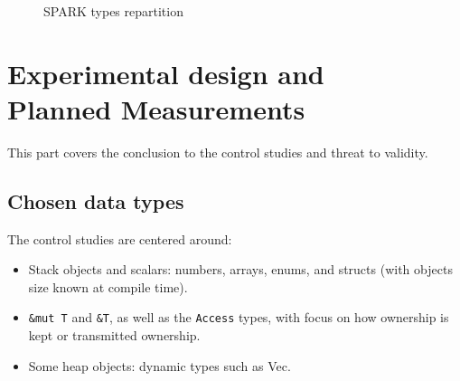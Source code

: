 \documentclass[nomenclature, english, bibtex]{kththesis}
\begin{document}
\begin{figure}[ht!]
  \centering
  \caption{SPARK types repartition}
  \label{fig:repartition_spark}
\end{figure}
\FloatBarrier



\section[Experimental design/Planned Measurements]{Experimental design and\\Planned Measurements}
\label{sec:experimentalDesign}

This part covers the conclusion to the control studies and threat to validity.
\subsection{Chosen data types}
The control studies are centered around:
\begin{itemize}
    \item Stack objects and scalars: numbers, arrays, enums, and structs (with objects size known at compile time).
    \item \texttt{\&mut T} and \texttt{\&T}, as well as the \texttt{Access} types, with focus on how ownership is kept or transmitted ownership.
    \item Some heap objects: dynamic types such as Vec.
\end{itemize}
\end{document}
